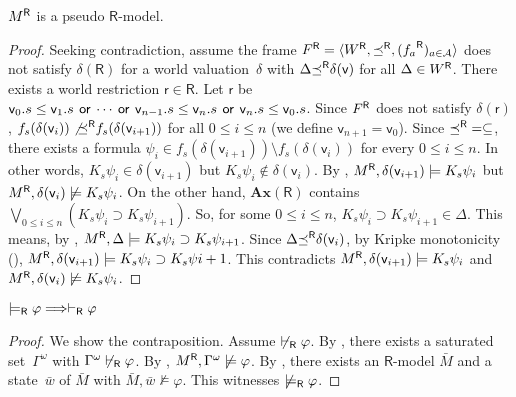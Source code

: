   \begin{proposition}
   ${M}^{\mathsf R}$ is a pseudo $\mathsf R$-model.
  \end{proposition}
  \begin{proof}
   Seeking contradiction,
   assume the frame ${F}^{\mathsf R} = \langle{{W}^{\mathsf R}, {\preceq}^{\mathsf R}, ({f_a}^{\mathsf R})_{a\in\mathcal A}}\rangle$
   does not satisfy $\delta(\mathsf R)$ for
   a world valuation~$\delta$ with
   $\Delta{\preceq}^{\mathsf R}\delta(\mathsf v)$ for all $\Delta\in{W}^{\mathsf R}$.
   There exists a world restriction
   $\mathsf r\in\mathsf R$.
   Let $\mathsf r$ be $\mathsf v_0.s\le\mathsf v_1.s\,\mathbin{\mathsf{or}}\,\cdots \,\mathbin{\mathsf{or}}\,\mathsf
   v_{n-1}.s\le\mathsf v_n.s\,\mathbin{\mathsf{or}}\,\mathsf v_n.s\le\mathsf v_0.s$.
   Since ${F}^{\mathsf R}$ does not satisfy $\delta(\mathsf r)$,
   $f_s(\delta(\mathsf v_i))\not{{\preceq}^{\mathsf R}}f_s(\delta(\mathsf v_{i+1}))$
   for
   all $0\le i\le n$ (we define $\mathsf v_{n+1} = \mathsf v_0$).
   Since ${\preceq}^{\mathsf R} = \subseteq$, there exists
   a formula $\psi_i\in f_s(\delta(\mathsf v_{i+1}))\setminus
   f_s(\delta(\mathsf v_i))$ for every $0\le i\le n$.
   In other words, $K_s\psi_i\in\delta(\mathsf v_{i+1})$
   but $K_s\psi_i\notin\delta(\mathsf v_i)$.
   By ,
   ${M}^{\mathsf R},\delta(\mathsf v_{i+1})\models K_s\psi_i$ but
   ${M}^{\mathsf R},\delta(\mathsf v_{i})\not\models K_s\psi_i$.
   On the other hand, $\mathbf{Ax}(\mathsf R)$ contains
   $\bigvee_{0\le i\le n}\left(K_s\psi_i\supset K_s\psi_{i+1}\right)$.
   So, for some $0\le i\le n$,
   $K_s\psi_i\supset K_s\psi_{i+1}\in\Delta$.
   This means, by ,
   ${M}^{\mathsf R},\Delta\models K_s\psi_i\supset K_s\psi_{i+1}$.
   Since $\Delta{\preceq}^{\mathsf R}\delta(\mathsf v_i)$,
   by Kripke monotonicity (),
   ${M}^{\mathsf R},\delta(\mathsf v_{i+1})\models K_s\psi_i\supset K_s\psi{i+1}$.
   This contradicts ${M}^{\mathsf R},\delta(\mathsf v_{i+1})\models K_s\psi_i$ and
   ${M}^{\mathsf R},\delta(\mathsf v_i)\not\models K_s\psi_i$.
  \end{proof}

  \begin{lemma}[Completeness]
   $\models_{\mathsf R}\varphi\Longrightarrow\vdash_{\mathsf R}\varphi$
  \end{lemma}
  \begin{proof}
   We show the contraposition.
   Assume $\not\vdash_{\mathsf R} \varphi$. By
   , there exists
   a saturated set~$\Gamma^\omega$ with $\Gamma^\omega\not\vdash_{\mathsf R}\varphi$.
   By , ${M}^{\mathsf R}, \Gamma^\omega\not\models\varphi$.
   By , there exists an
   $\mathsf R$-model $\bar M$ and a state~$\bar w$ of $\bar M$
   with $\bar M,\bar w\not\models \varphi$.
   This witnesses $\not\models_{\mathsf R}\varphi$.
  \end{proof}
